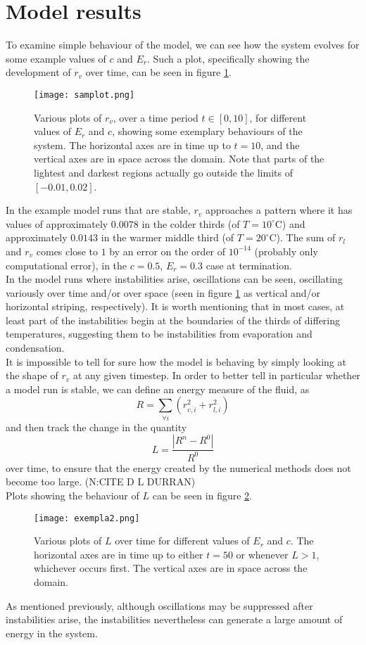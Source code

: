 \documentclass[11pt]{article}
\begin{document}
\section{Model results}
To examine simple behaviour of the model, we can see how the system evolves for some example values of $c$ and $E_r$. Such a plot, specifically showing the development of $r_v$ over time, can be seen in figure \ref{fig:samplot}.
\begin{figure}[H]
\centering
\texttt{[image: samplot.png]}
\caption{Various plots of $r_v$, over a time period $t\in[0,10]$, for different values of $E_r$ and $c$, showing some exemplary behaviours of the system. The horizontal axes are in time up to $t=10$, and the vertical axes are in space across the domain. Note that parts of the lightest and darkest regions actually go outside the limits of $[-0.01,0.02]$.}
\label{fig:samplot}
\end{figure}
In the example model runs that are stable, $r_v$ approaches a pattern where it has values of approximately $0.0078$ in the colder thirds (of $T=10^{\circ}$C) and approximately $0.0143$ in the warmer middle third (of $T=20^{\circ}$C). The sum of $r_l$ and $r_v$ comes close to $1$ by an error on the order of $10^{-14}$ (probably only computational error), in the $c=0.5$, $E_r=0.3$ case at termination. \\
In the model runs where instabilities arise, oscillations can be seen, oscillating variously over time and/or over space (seen in figure \ref{fig:samplot} as vertical and/or horizontal striping, respectively). It is worth mentioning that in most cases, at least part of the instabilities begin at the boundaries of the thirds of differing temperatures, suggesting them to be instabilities from evaporation and condensation. \\
It is impossible to tell for sure how the model is behaving by simply looking at the shape of $r_v$ at any given timestep. In order to better tell in particular whether a model run is stable, we can define an energy measure of the fluid, as
\[
R = \sum_{\forall i}\left(r_{v,i}^2+r_{l,i}^2\right)
\]
and then track the change in the quantity
\[
L = \frac{\left|R^n - R^0\right|}{R^0}
\]
over time, to ensure that the energy created by the numerical methods does not become too large. (N:CITE D L DURRAN) \\
Plots showing the behaviour of $L$ can be seen in figure \ref{fig:exempla2}.
\begin{figure}[H]
\centering
\texttt{[image: exempla2.png]}
\caption{Various plots of $L$ over time for different values of $E_r$ and $c$. The horizontal axes are in time up to either $t=50$ or whenever $L>1$, whichever occurs first. The vertical axes are in space across the domain.}
\label{fig:exempla2}
\end{figure}
As mentioned previously, although oscillations may be suppressed after instabilities arise, the instabilities nevertheless can generate a large amount of energy in the system.
\end{document}
